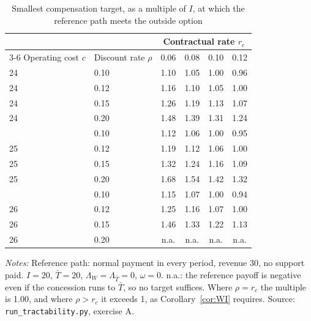 \begin{table}[htbp]\centering\small
\caption{Smallest compensation target, as a multiple of $I$, at which the reference path meets the outside option}\label{tab:A}
\begin{threeparttable}\begin{tabular}{llcccc}\toprule
 & & \multicolumn{4}{c}{Contractual rate $r_c$}\\\cmidrule(l){3-6}
Operating cost $c$ & Discount rate $\rho$ & 0.06 & 0.08 & 0.10 & 0.12\\\midrule
24 & 0.10 & 1.10 & 1.05 & 1.00 & 0.96\\
24 & 0.12 & 1.16 & 1.10 & 1.05 & 1.00\\
24 & 0.15 & 1.26 & 1.19 & 1.13 & 1.07\\
24 & 0.20 & 1.48 & 1.39 & 1.31 & 1.24\\
\addlinespace
25 & 0.10 & 1.12 & 1.06 & 1.00 & 0.95\\
25 & 0.12 & 1.19 & 1.12 & 1.06 & 1.00\\
25 & 0.15 & 1.32 & 1.24 & 1.16 & 1.09\\
25 & 0.20 & 1.68 & 1.54 & 1.42 & 1.32\\
\addlinespace
26 & 0.10 & 1.15 & 1.07 & 1.00 & 0.94\\
26 & 0.12 & 1.25 & 1.16 & 1.07 & 1.00\\
26 & 0.15 & 1.46 & 1.33 & 1.22 & 1.13\\
26 & 0.20 & n.a. & n.a. & n.a. & n.a.\\
\bottomrule\end{tabular}
\begin{tablenotes}\footnotesize\item \textit{Notes:} Reference path: normal payment in every period, revenue 30, no support paid. $I = 20$, $\bar T = 20$, $\Lambda_W = \Lambda_{\bar T} = 0$, $\omega = 0$. n.a.: the reference payoff is negative even if the concession runs to $\bar T$, so no target suffices. Where $\rho = r_c$ the multiple is 1.00, and where $\rho > r_c$ it exceeds 1, as Corollary~\ref{cor:WI} requires. Source: \texttt{run\_tractability.py}, exercise A.\end{tablenotes}
\end{threeparttable}\end{table}

